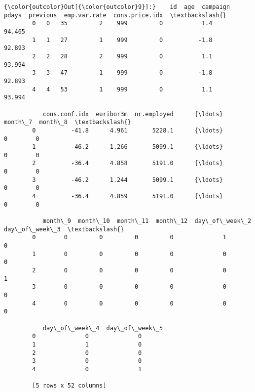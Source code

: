 \documentclass[11pt]{article}
\begin{document}
\begin{Verbatim}[commandchars=\\\{\}]
{\color{outcolor}Out[{\color{outcolor}9}]:}    id  age  campaign  pdays  previous  emp.var.rate  cons.price.idx  \textbackslash{}
        0   0   35         2    999         0           1.4          94.465   
        1   1   27         1    999         0          -1.8          92.893   
        2   2   28         2    999         0           1.1          93.994   
        3   3   47         1    999         0          -1.8          92.893   
        4   4   53         1    999         0           1.1          93.994   
        
           cons.conf.idx  euribor3m  nr.employed      {\ldots}        month\_7  month\_8  \textbackslash{}
        0          -41.8      4.961       5228.1      {\ldots}              0        0   
        1          -46.2      1.266       5099.1      {\ldots}              0        0   
        2          -36.4      4.858       5191.0      {\ldots}              0        0   
        3          -46.2      1.244       5099.1      {\ldots}              0        0   
        4          -36.4      4.859       5191.0      {\ldots}              0        0   
        
           month\_9  month\_10  month\_11  month\_12  day\_of\_week\_2  day\_of\_week\_3  \textbackslash{}
        0        0         0         0         0              1              0   
        1        0         0         0         0              0              0   
        2        0         0         0         0              0              1   
        3        0         0         0         0              0              0   
        4        0         0         0         0              0              0   
        
           day\_of\_week\_4  day\_of\_week\_5  
        0              0              0  
        1              1              0  
        2              0              0  
        3              0              0  
        4              0              1  
        
        [5 rows x 52 columns]
\end{Verbatim}
            
\end{document}
